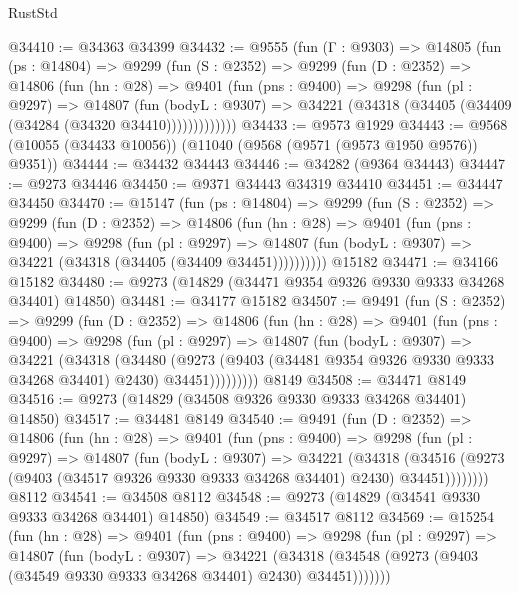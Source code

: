 \begin{lexlean}{RustStd}
\begin{coremodule}
{\begin{coremodule}
{{{{{{{{{{{{{{{{{{{{{{{{{{{{{{{{{{{{{{{{{{{{{{{{{{{{{{{@34410 := @34363 @34399
@34432 := @9555
    (fun (Γ : @9303) =>
    @14805
      (fun (ps : @14804) =>
      @9299
        (fun (S : @2352) =>
        @9299
          (fun (D : @2352) =>
          @14806
            (fun (hn : @28) =>
            @9401
              (fun (pns : @9400) =>
              @9298
                (fun (pl : @9297) =>
                @14807
                  (fun (bodyL : @9307) =>
                  @34221 (@34318 (@34405 (@34409 (@34284 (@34320 @34410)))))))))))))
@34433 := @9573 @1929
@34443 := @9568 (@10055 (@34433 @10056)) (@11040 (@9568 (@9571 (@9573 @1950 @9576)) @9351))
@34444 := @34432 @34443
@34446 := @34282 (@9364 @34443)
@34447 := @9273 @34446
@34450 := @9371 @34443 @34319 @34410
@34451 := @34447 @34450
@34470 := @15147
    (fun (ps : @14804) =>
    @9299
      (fun (S : @2352) =>
      @9299
        (fun (D : @2352) =>
        @14806
          (fun (hn : @28) =>
          @9401
            (fun (pns : @9400) =>
            @9298
              (fun (pl : @9297) =>
              @14807 (fun (bodyL : @9307) => @34221 (@34318 (@34405 (@34409 @34451))))))))))
    @15182
@34471 := @34166 @15182
@34480 := @9273 (@14829 (@34471 @9354 @9326 @9330 @9333 @34268 @34401) @14850)
@34481 := @34177 @15182
@34507 := @9491
    (fun (S : @2352) =>
    @9299
      (fun (D : @2352) =>
      @14806
        (fun (hn : @28) =>
        @9401
          (fun (pns : @9400) =>
          @9298
            (fun (pl : @9297) =>
            @14807
              (fun (bodyL : @9307) =>
              @34221
                (@34318
                  (@34480
                    (@9273
                      (@9403 (@34481 @9354 @9326 @9330 @9333 @34268 @34401) @2430)
                      @34451)))))))))
    @8149
@34508 := @34471 @8149
@34516 := @9273 (@14829 (@34508 @9326 @9330 @9333 @34268 @34401) @14850)
@34517 := @34481 @8149
@34540 := @9491
    (fun (D : @2352) =>
    @14806
      (fun (hn : @28) =>
      @9401
        (fun (pns : @9400) =>
        @9298
          (fun (pl : @9297) =>
          @14807
            (fun (bodyL : @9307) =>
            @34221
              (@34318
                (@34516 (@9273 (@9403 (@34517 @9326 @9330 @9333 @34268 @34401) @2430) @34451))))))))
    @8112
@34541 := @34508 @8112
@34548 := @9273 (@14829 (@34541 @9330 @9333 @34268 @34401) @14850)
@34549 := @34517 @8112
@34569 := @15254
    (fun (hn : @28) =>
    @9401
      (fun (pns : @9400) =>
      @9298
        (fun (pl : @9297) =>
        @14807
          (fun (bodyL : @9307) =>
          @34221
            (@34318 (@34548 (@9273 (@9403 (@34549 @9330 @9333 @34268 @34401) @2430) @34451)))))))
}}}}}}}}}}}}}}}}}}}}}}}}}}}}}}}}}}}}}}}}}}}}}}}}}}}}}}}
\end{coremodule}}
\end{coremodule}
\end{lexlean}
